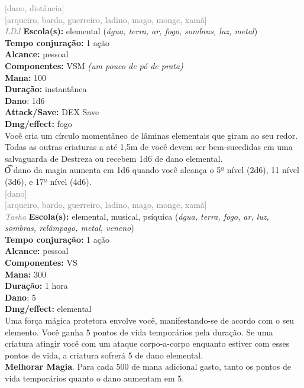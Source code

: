 \documentclass{RPG_Adventure}[2021/10/20]
\begin{document}
{\scriptsize \textcolor{gray}{[dano, distância]\\}}
{\scriptsize \textcolor{gray}{[arqueiro, bardo, guerreiro, ladino, mago, monge, xamã]\\}}
{\tiny \textcolor{gray}{\textit{LDJ}}}\jump{}
{\small \t \textbf{Escola(s):} elemental (\textit{água, terra, ar, fogo, sombras, luz, metal})\\\t \textbf{Tempo conjuração:} 1 ação\\\t \textbf{Alcance:} pessoal\\\t \textbf{Componentes:} VSM \textit{(um pouco de pó de prata)}\\\t \textbf{Mana:} 100\\\t \textbf{Duração:} instantânea\\\t \textbf{Dano}: 1d6\\\t \textbf{Attack/Save:} DEX Save\\\t \textbf{Dmg/effect:} fogo\\}
{\normalsize Você cria um círculo momentâneo de lâminas elementais que giram ao seu redor. Todas as outras criaturas a até 1,5m de você devem ser bem-sucedidas em uma salvaguarda de Destreza ou recebem 1d6 de dano elemental.\\\t O dano da magia aumenta em 1d6 quando você alcança o 5º nível (2d6), 11 nível (3d6), e 17º nível (4d6).\\}
{\scriptsize \textcolor{gray}{[dano]\\}}
{\scriptsize \textcolor{gray}{[arqueiro, bardo, guerreiro, ladino, mago, monge, xamã]\\}}
{\tiny \textcolor{gray}{\textit{Tasha}}}\jump{}
{\small \t \textbf{Escola(s):} elemental, musical, psíquica (\textit{água, terra, fogo, ar, luz, sombras, relâmpago, metal, veneno})\\\t \textbf{Tempo conjuração:} 1 ação\\\t \textbf{Alcance:} pessoal\\\t \textbf{Componentes:} VS\\\t \textbf{Mana:} 300\\\t \textbf{Duração:} 1 hora\\\t \textbf{Dano}: 5\\\t \textbf{Dmg/effect:} elemental\\}
{\normalsize Uma força mágica protetora envolve você, manifestando-se de acordo com o seu elemento. Você ganha 5 pontos de vida temporários pela duração. Se uma criatura atingir você com um ataque corpo-a-corpo enquanto estiver com esses pontos de vida, a criatura sofrerá 5 de dano elemental.\\\t \textbf{Melhorar Magia}. Para cada 500 de mana adicional gasto, tanto os pontos de vida temporários quanto o dano aumentam em 5.\\}
\end{document}
